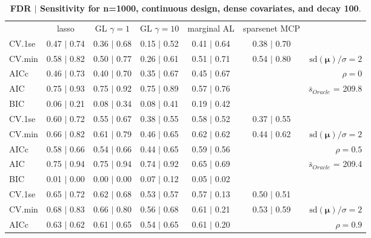 \begin{table}\vspace{-.5cm}
\caption[l]{ {\it }
{ \bf FDR $\boldsymbol{\mid}$ Sensitivity for n=1000, continuous design, dense covariates, and  decay  100}.}
\vspace{-.5cm}
\footnotesize{}
\begin{center}
\begin{tabular}{l*{5}{c}|r}
 & lasso & GL $\gamma=1$ & GL $\gamma=10$ & marginal AL & sparsenet MCP  & \\
 \cline{1-7}
CV.1se & 0.47 $\mid$ 0.74 & 0.36 $\mid$ 0.68 & 0.15 $\mid$ 0.52 & 0.41 $\mid$ 0.64 & 0.38 $\mid$ 0.70 & \\
CV.min & 0.58 $\mid$ 0.82 & 0.50 $\mid$ 0.77 & 0.26 $\mid$ 0.61 & 0.51 $\mid$ 0.71 & 0.54 $\mid$ 0.80 &  $\mathrm{sd}(\mathbf{\mu})/\sigma=2$ \\
AICc & 0.46 $\mid$ 0.73 & 0.40 $\mid$ 0.70 & 0.35 $\mid$ 0.67 & 0.45 $\mid$ 0.67 & & $\rho=0$ \\
AIC & 0.75 $\mid$ 0.93 & 0.75 $\mid$ 0.92 & 0.75 $\mid$ 0.89 & 0.57 $\mid$ 0.76 & &  \multirow{2}{*}{$\bar{s}_{Oracle}$ = 209.8} \\
BIC & 0.06 $\mid$ 0.21 & 0.08 $\mid$ 0.34 & 0.08 $\mid$ 0.41 & 0.19 $\mid$ 0.42 & &  \\
 \hline 
CV.1se & 0.60 $\mid$ 0.72 & 0.55 $\mid$ 0.67 & 0.38 $\mid$ 0.55 & 0.58 $\mid$ 0.52 & 0.37 $\mid$ 0.55 & \\
CV.min & 0.66 $\mid$ 0.82 & 0.61 $\mid$ 0.79 & 0.46 $\mid$ 0.65 & 0.62 $\mid$ 0.62 & 0.44 $\mid$ 0.62 &  $\mathrm{sd}(\mathbf{\mu})/\sigma=2$ \\
AICc & 0.58 $\mid$ 0.66 & 0.54 $\mid$ 0.66 & 0.44 $\mid$ 0.65 & 0.59 $\mid$ 0.56 & & $\rho=0.5$ \\
AIC & 0.75 $\mid$ 0.94 & 0.75 $\mid$ 0.94 & 0.74 $\mid$ 0.92 & 0.65 $\mid$ 0.69 & &  \multirow{2}{*}{$\bar{s}_{Oracle}$ = 209.4} \\
BIC & 0.01 $\mid$ 0.00 & 0.00 $\mid$ 0.00 & 0.07 $\mid$ 0.12 & 0.05 $\mid$ 0.02 & &  \\
 \hline 
CV.1se & 0.65 $\mid$ 0.72 & 0.62 $\mid$ 0.68 & 0.53 $\mid$ 0.57 & 0.57 $\mid$ 0.13 & 0.50 $\mid$ 0.51 & \\
CV.min & 0.68 $\mid$ 0.83 & 0.66 $\mid$ 0.80 & 0.56 $\mid$ 0.68 & 0.61 $\mid$ 0.21 & 0.53 $\mid$ 0.59 &  $\mathrm{sd}(\mathbf{\mu})/\sigma=2$ \\
AICc & 0.63 $\mid$ 0.62 & 0.61 $\mid$ 0.65 & 0.54 $\mid$ 0.65 & 0.61 $\mid$ 0.20 & & $\rho=0.9$ \\

\end{tabular}
\end{center}
\end{table}
